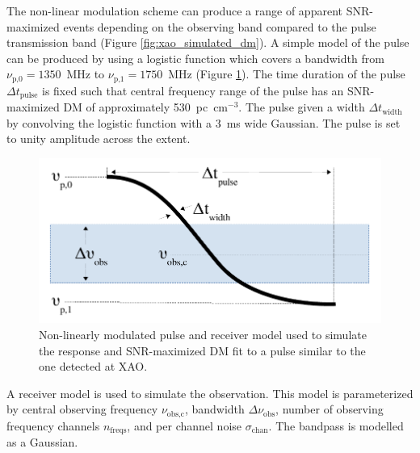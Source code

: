 \documentclass[a4paper,fleqn,usenatbib]{mnras}
\begin{document}
The non-linear modulation scheme can produce a range of apparent SNR-maximized
events depending on the observing band compared to the pulse transmission band
(Figure \ref{fig:xao_simulated_dm}).  A simple model of the pulse can be
produced by using a logistic function which covers a bandwidth from
$\nu_{\textrm{p,0}} = 1350$~MHz to $\nu_{\textrm{p,1}} = 1750$~MHz (Figure
\ref{fig:xao_simulation_diagram}). The time duration of the pulse $\Delta
t_{\textrm{pulse}}$ is fixed such that central frequency range of the pulse has
an SNR-maximized DM of approximately 530~pc~cm$^{-3}$. The pulse given a width
$\Delta t_{\textrm{width}}$ by convolving the logistic function with a 3~ms wide
Gaussian. The pulse is set to unity amplitude across the extent.

\begin{figure}
    \includegraphics[width=1.0\linewidth]{figures/simulation_diagram.pdf}
    \caption{Non-linearly modulated pulse and receiver model used to simulate
    the response and SNR-maximized DM fit to a pulse similar to the one detected
    at XAO.
    }
    \label{fig:xao_simulation_diagram}
\end{figure}

A receiver model is used to simulate the observation. This model is
parameterized by central observing frequency $\nu_{\textrm{obs,c}}$, bandwidth
$\Delta \nu_{\textrm{obs}}$, number of observing frequency channels
$n_{\textrm{freqs}}$, and per channel noise $\sigma_{\textrm{chan}}$. The
bandpass is modelled as a Gaussian.
\end{document}
